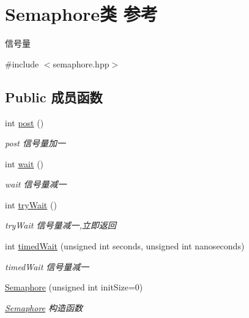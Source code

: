 \hypertarget{classSemaphore}{}\section{Semaphore类 参考}
\label{classSemaphore}


信号量  




{\ttfamily \#include $<$semaphore.\+hpp$>$}

\subsection*{Public 成员函数}
\begin{DoxyCompactItemize}
\item 
int \hyperlink{classSemaphore_a93794b9ab0c6c7c35acce0769bf67caf}{post} ()
\begin{DoxyCompactList}\small\item\em post 信号量加一 \end{DoxyCompactList}\item 
int \hyperlink{classSemaphore_ab50da3ab3fdc7f56acc85cbdf248c98d}{wait} ()
\begin{DoxyCompactList}\small\item\em wait 信号量减一 \end{DoxyCompactList}\item 
int \hyperlink{classSemaphore_acc15178e43d33745f4acc6e2b2cccf9b}{try\+Wait} ()
\begin{DoxyCompactList}\small\item\em try\+Wait 信号量减一,立即返回 \end{DoxyCompactList}\item 
int \hyperlink{classSemaphore_a203e6b9f726ca5defc94379e9145278e}{timed\+Wait} (unsigned int seconds, unsigned int nanoseconds)
\begin{DoxyCompactList}\small\item\em timed\+Wait 信号量减一 \end{DoxyCompactList}\item 
\hyperlink{classSemaphore_a34841feb22e781d7d10ee7205f56bd8e}{Semaphore} (unsigned int init\+Size=0)
\begin{DoxyCompactList}\small\item\em \hyperlink{classSemaphore}{Semaphore} 构造函数 \end{DoxyCompactList}\item 
\mbox{\label{classSemaphore_a7039839a61ed189258fb0de6338848e3}} 

\end{DoxyCompactItemize}
